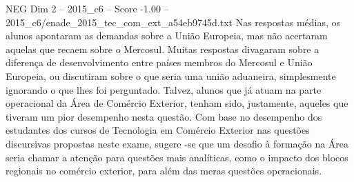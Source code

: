 \begin{textsample}{NEG Dim 2 – 2015\_c6 – Score -1.00 – 2015\_c6/enade\_2015\_tec\_com\_ext\_a54eb9745d.txt}
Nas respostas médias, os alunos apontaram as demandas sobre a União Europeia, mas não acertaram aquelas que recaem sobre o Mercosul.
Muitas respostas divagaram sobre a diferença de desenvolvimento entre países membros do Mercosul e União Europeia, ou discutiram sobre o que seria uma união aduaneira, simplesmente ignorando o que lhes foi perguntado.
Talvez, alunos que já atuam na parte operacional da Área de Comércio Exterior, tenham sido, justamente, aqueles que tiveram um pior desempenho nesta questão.
Com base no desempenho dos estudantes dos cursos de Tecnologia em Comércio Exterior nas questões discursivas propostas neste exame, sugere -se que um desafio à formação na Área seria chamar a atenção para questões mais analíticas, como o impacto dos blocos regionais no comércio exterior, para além das meras questões operacionais.

\end{textsample}
